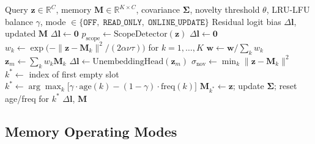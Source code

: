\begin{algorithm}[htbp]
\small
\caption{EmberVLM episodic memory: scope detection, retrieval, novelty write, and LRU-LFU eviction.}
\label{alg:embervlm_memory}
\begin{algorithmic}[1]
\Require Query $\mathbf{z} \in \mathbb{R}^C$, memory $\mathbf{M} \in \mathbb{R}^{K \times C}$, covariance $\boldsymbol{\Sigma}$,
\Statex \hspace{\algorithmicindent} novelty threshold $\theta$, LRU-LFU balance $\gamma$,
\Statex \hspace{\algorithmicindent} mode $\in \{\texttt{OFF},\; \texttt{READ\_ONLY},\; \texttt{ONLINE\_UPDATE}\}$
\Ensure Residual logit bias $\Delta\mathbf{l}$, updated $\mathbf{M}$
    \State \Return $\Delta\mathbf{l} \leftarrow \mathbf{0}$ 
\EndIf
\State $p_{\text{scope}} \leftarrow \text{ScopeDetector}(\mathbf{z})$ 
    \State \Return $\Delta\mathbf{l} \leftarrow \mathbf{0}$ 
\EndIf
\State $w_k \leftarrow \exp\!\bigl(-\|\mathbf{z} - \mathbf{M}_k\|^2 / (2\alpha\nu\tau)\bigr)$ for $k=1,\ldots,K$
\State $\mathbf{w} \leftarrow \mathbf{w} / \textstyle\sum_k w_k$ 
\State $\mathbf{z}_m \leftarrow \textstyle\sum_k w_k \mathbf{M}_k$ 
\State $\Delta\mathbf{l} \leftarrow \text{UnembeddingHead}(\mathbf{z}_m)$ 
    \State $\sigma_{\text{nov}} \leftarrow \min_k \|\mathbf{z} - \mathbf{M}_k\|^2$ 
     
            \State $k^* \leftarrow$ index of first empty slot
        \Else {}
            \State $k^* \leftarrow \arg\max_k\bigl[\gamma \cdot \text{age}(k) - (1{-}\gamma) \cdot \text{freq}(k)\bigr]$
        \EndIf
        \State $\mathbf{M}_{k^*} \leftarrow \mathbf{z}$; update $\boldsymbol{\Sigma}$; reset age/freq for $k^*$
    \EndIf
\EndIf
\State \Return $\Delta\mathbf{l}$, $\mathbf{M}$
\end{algorithmic}
\end{algorithm}

\subsection{Memory Operating Modes}

